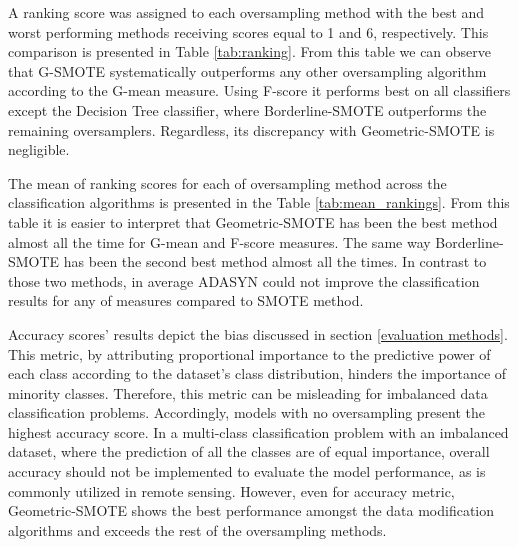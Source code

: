 \documentclass[remotesensing,article,submit,moreauthors,pdftex]{Definitions/mdpi}
\begin{document}
A ranking score was assigned to each oversampling method with the best and worst
performing methods receiving scores equal to 1 and 6, respectively. This
comparison is presented in Table \ref{tab:ranking}. From this table we can
observe that G-SMOTE systematically outperforms any other oversampling algorithm
according to the G-mean measure. Using F-score it performs best on all
classifiers except the Decision Tree classifier, where Borderline-SMOTE
outperforms the remaining oversamplers. Regardless, its discrepancy with
Geometric-SMOTE is negligible.


The mean of ranking scores for each of oversampling method across the
classification algorithms is presented in the Table \ref{tab:mean_rankings}.
From this table it is easier to interpret that Geometric-SMOTE has been the best
method almost all the time for G-mean and F-score measures. The same way
Borderline-SMOTE has been the second best method almost all the times. In
contrast to those two methods, in average ADASYN could not improve the
classification results for any of measures compared to SMOTE method.

Accuracy scores' results depict the bias discussed in section \ref{evaluation
methods}. This metric, by attributing proportional importance to the predictive
power of each class according to the dataset's class distribution, hinders the
importance of minority classes. Therefore, this metric can be misleading for
imbalanced data classification problems. Accordingly, models with no
oversampling present the highest accuracy score. In a multi-class classification
problem with an imbalanced dataset, where the prediction of all the classes are
of equal importance, overall accuracy should not be implemented to evaluate the
model performance, as is commonly utilized in remote sensing. However, even for
accuracy metric, Geometric-SMOTE shows the best performance amongst the data
modification algorithms and exceeds the rest of the oversampling methods.
\end{document}
